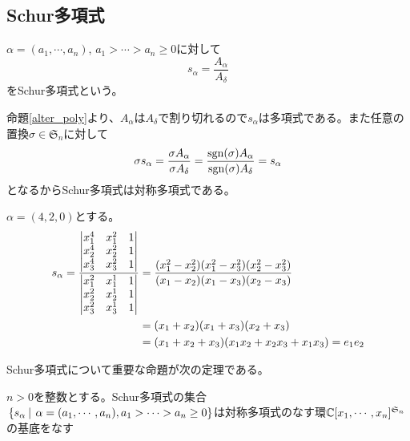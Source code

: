 \documentclass{ltjsarticle}
\begin{document}
\subsection{Schur多項式}

\begin{defin}[Schur多項式]
    $\alpha=(a_1,\cdots,a_n)$, $a_1>\cdots> a_n\geq 0$に対して
    \[
    s_\alpha=\frac{A_\alpha}{A_\delta}  
    \]
    をSchur多項式という。
\end{defin}


命題\ref{alter_poly}より、$A_\alpha$は$A_\delta$で割り切れるので$s_\alpha$は多項式である。また任意の置換$\sigma\in\mathfrak{S}_n$に対して
\[
    \sigma s_\alpha=\frac{\sigma A_\alpha}{\sigma A_\delta}=\frac{\mathrm{sgn} (\sigma)A_\alpha}{\mathrm{sgn} (\sigma)A_\delta}=s_\alpha    
\]
となるからSchur多項式は対称多項式である。

\begin{eg}
    $\alpha=(4,2,0)$とする。
    \begin{align*}
        s_\alpha=\frac{\begin{vmatrix} x_1^4&x_1^2&1\\
                             x_2^4&x_2^2&1\\
                             x_3^4&x_3^2&1 \end{vmatrix}}
                      {\begin{vmatrix} x_1^2&x_1^1&1\\
                             x_2^2&x_2^1&1\\
                             x_3^2&x_3^1&1 \end{vmatrix}}
                &=\frac{(x_1^2-x_2^2)(x_1^2-x_3^2)(x_2^2-x_3^2)}{(x_1-x_2)(x_1-x_3)(x_2-x_3)}\\
                &=(x_1+x_2)(x_1+x_3)(x_2+x_3)\\
                &=(x_1+x_2+x_3)(x_1x_2+x_2x_3+x_1x_3)=e_1e_2
    \end{align*}
\end{eg}


Schur多項式について重要な命題が次の定理である。

\begin{theo}\label{schur}
    $n>0$を整数とする。Schur多項式の集合$\left.\left\{s_\alpha \: \right| \: \alpha=(a_1,\cdots,a_n), a_1> \cdots> a_n\geq 0\right\}$は対称多項式のなす環$\mathbb{C}[x_1,\cdots,x_n]^{\mathfrak{S}_n}$の基底をなす
\end{theo}
\end{document}

